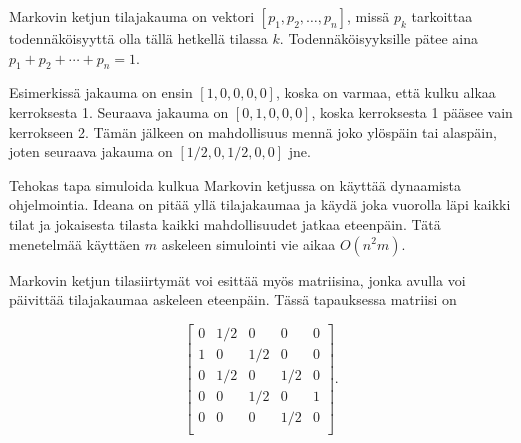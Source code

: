 \begin{center}
\end{center}

Markovin ketjun tilajakauma on vektori
$[p_1,p_2,\ldots,p_n]$, missä $p_k$ tarkoittaa
todennäköisyyttä olla tällä hetkellä tilassa $k$.
Todennäköisyyksille pätee aina $p_1+p_2+\cdots+p_n=1$.

Esimerkissä jakauma on ensin $[1,0,0,0,0]$,
koska on varmaa, että kulku alkaa kerroksesta 1.
Seuraava jakauma on $[0,1,0,0,0]$,
koska kerroksesta 1 pääsee vain kerrokseen 2.
Tämän jälkeen on mahdollisuus mennä joko ylöspäin
tai alaspäin, joten seuraava jakauma on $[1/2,0,1/2,0,0]$ jne.

Tehokas tapa simuloida kulkua Markovin ketjussa
on käyttää dynaamista ohjelmointia.
Ideana on pitää yllä tilajakaumaa
ja käydä joka vuorolla läpi kaikki tilat
ja jokaisesta tilasta kaikki mahdollisuudet jatkaa eteenpäin.
Tätä menetelmää käyttäen $m$ askeleen simulointi
vie aikaa $O(n^2 m)$.

Markovin ketjun tilasiirtymät voi esittää myös matriisina,
jonka avulla voi päivittää tilajakaumaa askeleen eteenpäin.
Tässä tapauksessa matriisi on

\[ 
 \begin{bmatrix}
  0 & 1/2 & 0 & 0 & 0 \\
  1 & 0 & 1/2 & 0 & 0 \\
  0 & 1/2 & 0 & 1/2 & 0 \\
  0 & 0 & 1/2 & 0 & 1 \\
  0 & 0 & 0 & 1/2 & 0 \\
 \end{bmatrix}.
\]

